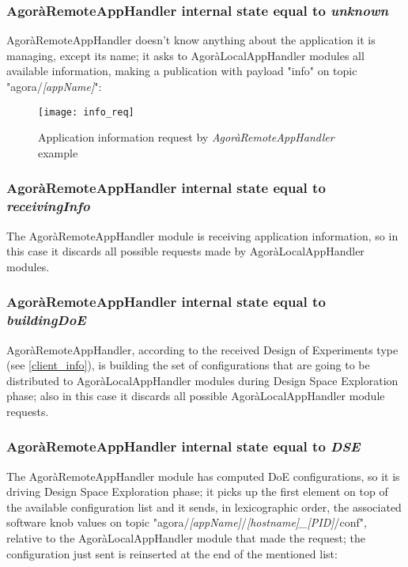 \subsubsection{AgoràRemoteAppHandler internal state equal to \textit{unknown}}\label{req_info}

AgoràRemoteAppHandler doesn't know anything about the application it is managing, except its name; it asks to AgoràLocalAppHandler modules all available information, making a publication with payload "info" on topic "agora/\textit{[appName]}":

\begin{figure}[H]

    \centering
    \texttt{[image: info\_req]}
    \caption{Application information request by \textit{AgoràRemoteAppHandler} example}
    
\end{figure}


\subsubsection{AgoràRemoteAppHandler internal state equal to \textit{receivingInfo}}

The AgoràRemoteAppHandler module is receiving application information, so in this case it discards all possible requests made by AgoràLocalAppHandler modules.


\subsubsection{AgoràRemoteAppHandler internal state equal to \textit{buildingDoE}}

AgoràRemoteAppHandler, according to the received Design of Experiments type (see \ref{client_info}), is building the set of configurations that are going to be distributed to AgoràLocalAppHandler modules during Design Space Exploration phase; also in this case it discards all possible AgoràLocalAppHandler module requests.


\subsubsection{AgoràRemoteAppHandler internal state equal to \textit{DSE}}\label{dse_conf}

The AgoràRemoteAppHandler module has computed DoE configurations, so it is driving Design Space Exploration phase; it picks up the first element on top of the available configuration list and it sends, in lexicographic order, the associated software knob values on topic "agora\slash{}\textit{[appName]}\slash{}\textit{[hostname]\_[PID]}\slash{}conf", relative to the AgoràLocalAppHandler module that made the request; the configuration just sent is reinserted at the end of the mentioned list:

